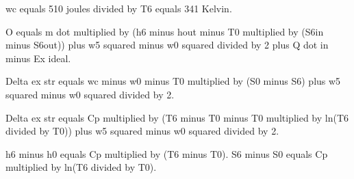 wc equals 510 joules divided by T6 equals 341 Kelvin.  

O equals m dot multiplied by (h6 minus hout minus T0 multiplied by (S6in minus S6out)) plus w5 squared minus w0 squared divided by 2 plus Q dot in minus Ex ideal.  

Delta ex str equals wc minus w0 minus T0 multiplied by (S0 minus S6) plus w5 squared minus w0 squared divided by 2.  

Delta ex str equals Cp multiplied by (T6 minus T0 minus T0 multiplied by ln(T6 divided by T0)) plus w5 squared minus w0 squared divided by 2.  

h6 minus h0 equals Cp multiplied by (T6 minus T0).  
S6 minus S0 equals Cp multiplied by ln(T6 divided by T0).